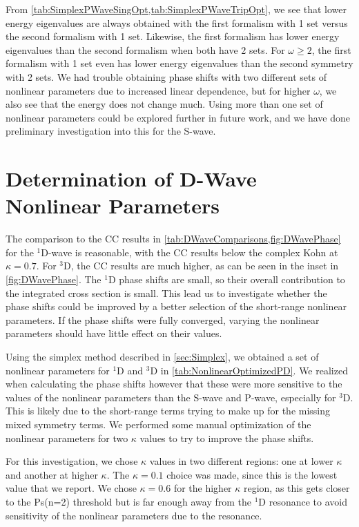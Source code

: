 \documentclass[Dissertation.tex]{subfiles}
\begin{document}
From \cref{tab:SimplexPWaveSingOpt,tab:SimplexPWaveTripOpt}, we see that 
lower energy eigenvalues are always obtained with the first formalism with 1 
set versus the second formalism with 1 set. Likewise, the first formalism has 
lower energy eigenvalues than the second formalism when both have 2 sets. For 
$\omega \geq 2$, the first formalism with 1 set even has lower energy 
eigenvalues than the second symmetry with 2 sets. We had trouble obtaining 
phase shifts with two different sets of nonlinear parameters due to increased 
linear dependence, but for higher $\omega$, we also see that the energy does 
not change much. Using more than one set of nonlinear parameters could be 
explored further in future work, and we have done preliminary investigation 
into this for the S-wave.


\section{Determination of D-Wave Nonlinear Parameters}
\label{sec:DWaveNonlinear}

The comparison to the CC results \cite{Walters2004,Blackwood2002}
in \cref{tab:DWaveComparisons,fig:DWavePhase} for the $^1$D-wave is
reasonable, with the CC results below the complex Kohn at $\kappa = 0.7$.
For $^3$D, the CC results are much higher, as can be seen in the inset
in \cref{fig:DWavePhase}. The $^1$D phase shifts are small, so their overall
contribution to the integrated cross section is small. 
This lead us to investigate whether the phase shifts could be improved by a
better selection of the short-range nonlinear parameters. If the phase shifts
were fully converged, varying the nonlinear parameters should have little
effect on their values.

Using the simplex method described in \cref{sec:Simplex}, we obtained a set of
nonlinear parameters for $^1$D and $^3$D in \cref{tab:NonlinearOptimizedPD}.
We realized when calculating the phase shifts however that these were more
sensitive to the values of the nonlinear parameters than the S-wave and P-wave,
especially for $^3$D. This is likely due to the short-range terms trying to
make up for the missing mixed symmetry terms. We performed some manual
optimization of the nonlinear parameters for two $\kappa$ values to try to
improve the phase shifts.

For this investigation, we chose $\kappa$ values in two different regions:
one at lower $\kappa$ and another at higher $\kappa$. The $\kappa = 0.1$ choice
was made, since this is the lowest value that we report. We chose $\kappa = 0.6$
for the higher $\kappa$ region, as this gets closer to the Ps(n=2) threshold
but is far enough away from the $^1$D resonance to avoid sensitivity of the
nonlinear parameters due to the resonance.
\end{document}
